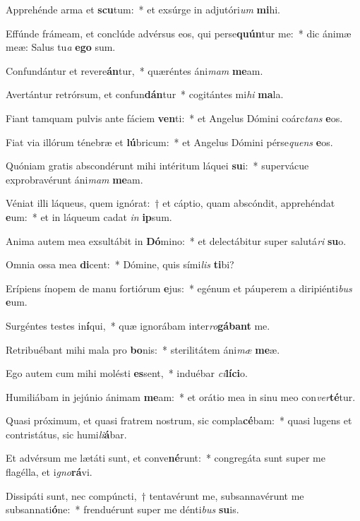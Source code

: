\item Apprehénde arma et \textbf{scu}tum:~* et exsúrge in adjutóri\textit{um} \textbf{mi}hi.
\item Effúnde frámeam, et conclúde advérsus eos, qui perse\textbf{quún}tur me:~* dic ánimæ meæ: Salus tu\textit{a} \textbf{e}\textbf{go} sum.
\item Confundántur et revere\textbf{án}tur,~* quæréntes áni\textit{mam} \textbf{me}am.
\item Avertántur retrórsum, et confun\textbf{dán}tur~* cogitántes mi\textit{hi} \textbf{ma}la.
\item Fiant tamquam pulvis ante fáciem \textbf{ven}ti:~* et Angelus Dómini coárc\textit{tans} \textbf{e}os.
\item Fiat via illórum ténebræ et \textbf{lú}bricum:~* et Angelus Dómini pérse\textit{quens} \textbf{e}os.
\item Quóniam gratis abscondérunt mihi intéritum láquei \textbf{su}i:~* supervácue exprobravérunt áni\textit{mam} \textbf{me}am.
\item Véniat illi láqueus, quem ignórat:~† et cáptio, quam abscóndit, apprehéndat \textbf{e}um:~* et in láqueum cadat \textit{in} \textbf{ip}sum.
\item Anima autem mea exsultábit in \textbf{Dó}mino:~* et delectábitur super salutá\textit{ri} \textbf{su}o.
\item Omnia ossa mea \textbf{di}cent:~* Dómine, quis sími\textit{lis} \textbf{ti}bi?
\item Erípiens ínopem de manu fortiórum \textbf{e}jus:~* egénum et páuperem a diripiénti\textit{bus} \textbf{e}um.
\item Surgéntes testes in\textbf{í}qui,~* quæ ignorábam inter\textit{ro}\textbf{gá}\textbf{bant} me.
\item Retribuébant mihi mala pro \textbf{bo}nis:~* sterilitátem áni\textit{mæ} \textbf{me}æ.
\item Ego autem cum mihi molésti \textbf{es}sent,~* induébar \textit{ci}\textbf{lí}\textbf{ci}o.
\item Humiliábam in jejúnio ánimam \textbf{me}am:~* et orátio mea in sinu meo con\textit{ver}\textbf{té}tur.
\item Quasi próximum, et quasi fratrem nostrum, sic compla\textbf{cé}bam:~* quasi lugens et contristátus, sic humi\textit{li}\textbf{á}bar.
\item Et advérsum me lætáti sunt, et conve\textbf{né}runt:~* congregáta sunt super me flagélla, et i\textit{gno}\textbf{rá}vi.
\item Dissipáti sunt, nec compúncti,~† tentavérunt me, subsannavérunt me subsannati\textbf{ó}ne:~* frenduérunt super me dénti\textit{bus} \textbf{su}is.
